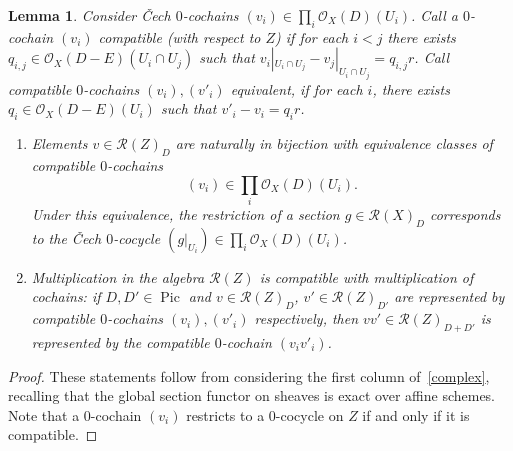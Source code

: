 \documentclass[a4paper,11pt]{amsart}
\theoremstyle{plain}
\newtheorem{lemma}[theorem]{Lemma}
\theoremstyle{definition}
\newcommand{\R}{\mathcal{R}}
\newcommand{\Ox}{\mathcal{O}}
\DeclareMathOperator{\Pic}{Pic}
\newcommand{\pic}{\Pic}
\begin{document}
\begin{lemma} Consider \v Cech $0$-cochains $(v_i) \in \prod_{i}\Ox_X(D)(U_i)$. Call a $0$-cochain $(v_i)$ compatible (with respect to $Z$) if for each $i < j$ there exists $q_{i,j} \in \Ox_X(D-E)(U_i \cap U_j)$ such that $v_i|_{U_i \cap U_j} - v_j|_{U_i \cap U_j} = q_{i,j}r$. Call compatible $0$-cochains $(v_i), (v'_i)$ equivalent, if for each $i$, there exists $q_i \in \Ox_X(D-E)(U_i)$ such that $v'_i - v_i = q_i r$. 
\begin{enumerate}
    \item[(i)] Elements $v\in \R(Z)_D$ are naturally in bijection with equivalence classes of compatible $0$-cochains
    $$(v_i)\in\prod_{i}\Ox_X(D)(U_i).$$ 
    Under this equivalence, the restriction of a section $g \in \R(X)_D$ corresponds to the \v Cech $0$-cocycle $(g|_{U_i}) \in \prod_{i}\Ox_X(D)(U_i)$. 
    \item[(ii)] Multiplication in the algebra $\R(Z)$ is compatible with multiplication of cochains: if $D,D' \in \pic$ and $v \in \R(Z)_D$, $v' \in \R(Z)_{D'}$ are represented by compatible $0$-cochains $(v_i), (v'_i)$ respectively, then $v v' \in \R(Z)_{D+D'}$ is represented by the compatible $0$-cochain $(v_i v'_i)$.
    \end{enumerate}\label{lemma_cocycle}
\end{lemma}
\begin{proof} These statements follow from considering the first column of~\eqref{complex}, recalling that the global section functor on sheaves is exact over affine schemes. Note that a $0$-cochain $(v_i)$ restricts to a $0$-cocycle on $Z$ if and only if it is compatible.
\end{proof}
\end{document}
